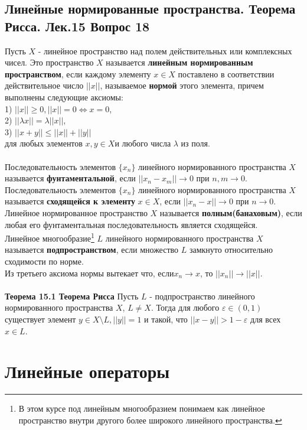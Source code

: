 \documentclass{article}
\begin{document}
\subsection{Линейные нормированные пространства. Теорема Рисса. Лек.15 \textbf{Вопрос 18}}
	Пусть $X$ - линейное пространство над полем действительных или комплексных чисел. Это пространство $X$ называется \textbf{линейным нормированным пространством}, если каждому элементу $x\in X$ поставлено в соответствии действительное число $||x||$, называемое \textbf{нормой} этого элемента, причем выполнены следующие аксиомы:\\
	1) $||x||\ge 0, ||x||=0 \Leftrightarrow x=0$,\\
	2) $||\lambda x||=\lambda||x||$,\\
	3) $||x+y||\le ||x||+||y||$\\
	для любых элементов $x,y\in X$и любого числа $\lambda$ из поля.\\
	\\
	Последовательность элементов $\{{x}_{n}\}$ линейного нормированного пространства $X$ называется \textbf{фунтаментальной}, если $||{x}_{n}-{x}_{m}||\rightarrow0$ при $n,m\rightarrow0$.\\
	Последовательность элементов $\{{x}_{n}\}$ линейного нормированного пространства $X$ называется \textbf{сходящейся к элементу} $x\in X$, если $||{x}_{n}-x||\rightarrow0$ при $n\rightarrow0$.\\
	Линейное нормированное пространство $X$ называется \textbf{полным(банаховым)}, если любая его фунтаментальная последовательность является сходящейся.\\
	Линейное многообразие\footnote{В этом курсе под линейным многообразием понимаем как линейное пространство внутри другого более широкого линейного пространства.} $L$ линейного нормированного пространства $X$ называется \textbf{подпространством}, если множество $L$ замкнуто относительно сходимости по норме.\\
	Из третьего аксиома нормы вытекает что, если${x}_{n}\rightarrow x$, то $||{x}_{n}||\rightarrow ||x||$.\\
	\\
	\textbf{Теорема 15.1 Теорема Рисса} Пусть $L$ - подпространство линейного нормированного пространства $X$, $L\ne X$. Тогда для любого $\varepsilon \in (0,1)$ существует элемент $y\in X\setminus L, ||y||=1$ и такой, что $||x-y||>1-\varepsilon$ для всех $x\in L$.\\
\section{Линейные операторы}
\end{document}
